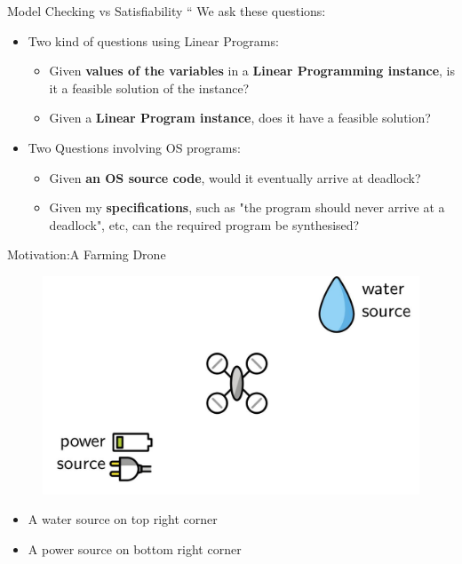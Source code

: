 \documentclass[usenames,dvipsnames]{beamer}
\begin{document}
\begin{frame}{Model Checking vs Satisfiability}     ``  
    We ask these questions:\pause
    \begin{itemize}
    \setlength\itemsep{1em}
        \item<2-> Two kind of questions using Linear Programs:
        \begin{itemize}
        \setlength\itemsep{1em}
            \item<3-> Given \textbf{values of the variables} in a \textbf{Linear Programming instance}, is it a feasible solution of the instance?

            \item<4-> Given a \textbf{Linear Program instance}, does it have a feasible solution?
        \end{itemize}

        \item<5-> Two Questions involving OS programs:
        \begin{itemize}
        \setlength\itemsep{1em}
            \item<6-> Given \textbf{an OS source code}, would it eventually arrive at deadlock?

            \item<7-> Given my \textbf{specifications}, such as "the program should never arrive at a deadlock", etc, can the required program be synthesised?
        \end{itemize}
    \end{itemize}
\end{frame}


\begin{frame}{Motivation:A Farming Drone}
    \begin{figure}
        \centering
        \includegraphics[scale=0.15]{images/drone-water-power.jpg}
    \end{figure}
    \begin{itemize}
        \item A water source on top right corner
        \item A power source on bottom right corner
    \end{itemize}
\end{frame}
\end{document}
